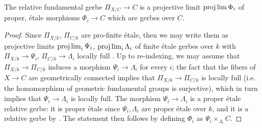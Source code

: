 \begin{lemma}
\notready\label{limit}
	The relative fundamental gerbe $\Pi_{X/C}\to C$ is a projective limit $\projlim \Phi_{i}$ of proper, étale morphisms $\Phi_{i}\to C$ which are gerbes over $C$.
\end{lemma}

\begin{proof}
	Since $\Pi_{X/k}$, $\Pi_{C/k}$ are pro-finite étale, then we may write them as projective limits $\projlim_{i}\Psi_{i}$, $\projlim_{i}\Lambda_{i}$ of finite étale gerbes over $k$ with $\Pi_{X/k}\to\Psi_{i}$, $\Pi_{C/k}\to\Lambda_{i}$ locally full \cite[Definition 3.4, Proposition 3.9]{bv19}. Up to re-indexing, we may assume that $\Pi_{X/k}\to\Pi_{C/k}$ induces a morphism $\Psi_{i}\to\Lambda_{i}$ for every $i$; the fact that the fibers of $X\to C$ are geometrically connected implies that $\Pi_{X/k}\to\Pi_{C/k}$ is locally full (i.e. the homomorphism of geometric fundamental groups is surjective), which in turn implies that $\Psi_{i}\to\Lambda_{i}$ is locally full. The morphism $\Psi_{i}\to\Lambda_{i}$ is a proper étale relative gerbe: it is proper étale since $\Psi_{i},\Lambda_{i}$ are proper étale over $k$, and it is a relative gerbe by \cite[Proposition 3.10]{bv19}. The statement then follows by defining $\Phi_{i}$ as $\Psi_{i}\times_{\Lambda_{i}}C$.
\end{proof}
